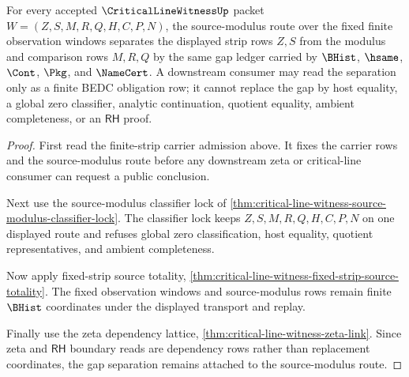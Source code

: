 \begin{theorem}
\label{thm:critical-line-witness-source-modulus-gap-separation}
For every accepted $\CriticalLineWitnessUp$ packet $W=(Z,S,M,R,Q,H,C,P,N)$, the source-modulus route over the fixed finite observation windows separates the displayed strip rows $Z,S$ from the modulus and comparison rows $M,R,Q$ by the same gap ledger carried by $\BHist$, $\hsame$, $\Cont$, $\Pkg$, and $\NameCert$. A downstream consumer may read the separation only as a finite BEDC obligation row; it cannot replace the gap by host equality, a global zero classifier, analytic continuation, quotient equality, ambient completeness, or an $\mathsf{RH}$ proof.
\end{theorem}
\begin{proof}
First read the finite-strip carrier admission above. It fixes the carrier rows and the source-modulus route before any downstream zeta or critical-line consumer can request a public conclusion.

Next use the source-modulus classifier lock of \autoref{thm:critical-line-witness-source-modulus-classifier-lock}. The classifier lock keeps $Z,S,M,R,Q,H,C,P,N$ on one displayed route and refuses global zero classification, host equality, quotient representatives, and ambient completeness.

Now apply fixed-strip source totality, \autoref{thm:critical-line-witness-fixed-strip-source-totality}. The fixed observation windows and source-modulus rows remain finite $\BHist$ coordinates under the displayed transport and replay.

Finally use the zeta dependency lattice, \autoref{thm:critical-line-witness-zeta-link}. Since zeta and $\mathsf{RH}$ boundary reads are dependency rows rather than replacement coordinates, the gap separation remains attached to the source-modulus route.
\end{proof}

